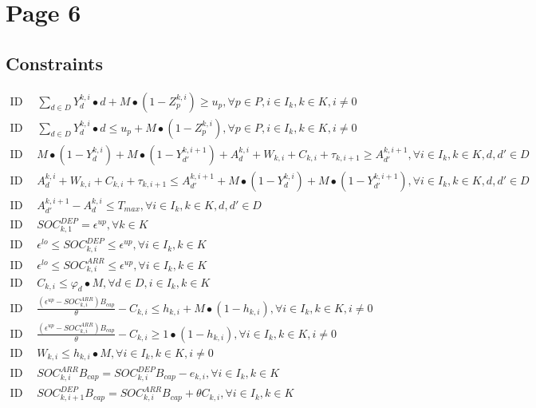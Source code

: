 \documentclass[11pt]{ctexart}
\begin{document}
\section*{Page 6}

\subsection*{Constraints}
\begin{align}
    \text{ID 12: } & \sum_{d \in D} Y_{d}^{k,i} \bullet d + M \bullet (1 - Z_{p}^{k,i}) \geq u_p, \forall p \in P, i \in I_k, k \in K, i \neq 0 \tag{12} \\
    \text{ID 13: } & \sum_{d \in D} Y_{d}^{k,i} \bullet d \leq u_p + M \bullet (1 - Z_{p}^{k,i}), \forall p \in P, i \in I_k, k \in K, i \neq 0 \tag{13} \\
    \text{ID 14: } & M \bullet (1 - Y_{d}^{k,i}) + M \bullet (1 - Y_{d'}^{k,i+1}) + A_{d}^{k,i} + W_{k,i} + C_{k,i} + \tau_{k,i+1} \geq A_{d'}^{k,i+1}, \forall i \in I_k, k \in K, d, d' \in D \tag{14} \\
    \text{ID 15: } & A_{d}^{k,i} + W_{k,i} + C_{k,i} + \tau_{k,i+1} \leq A_{d'}^{k,i+1} + M \bullet (1 - Y_{d}^{k,i}) + M \bullet (1 - Y_{d'}^{k,i+1}), \forall i \in I_k, k \in K, d, d' \in D \tag{15} \\
    \text{ID 16: } & A_{d'}^{k,i+1} - A_{d}^{k,i} \leq T_{max}, \forall i \in I_k, k \in K, d, d' \in D \tag{16} \\
    \text{ID 17: } & SOC_{k,1}^{DEP} = \epsilon^{up}, \forall k \in K \tag{17} \\
    \text{ID 18: } & \epsilon^{lo} \leq SOC_{k,i}^{DEP} \leq \epsilon^{up}, \forall i \in I_k, k \in K \tag{18} \\
    \text{ID 19: } & \epsilon^{lo} \leq SOC_{k,i}^{ARR} \leq \epsilon^{up}, \forall i \in I_k, k \in K \tag{19} \\
    \text{ID 20: } & C_{k,i} \leq \varphi_d \bullet M, \forall d \in D, i \in I_k, k \in K \tag{20} \\
    \text{ID 21: } & \frac{(\epsilon^{up} - SOC_{k,i}^{ARR})B_{cap}}{\theta} - C_{k,i} \leq h_{k,i} + M \bullet (1 - h_{k,i}), \forall i \in I_k, k \in K, i \neq 0 \tag{21} \\
    \text{ID 22: } & \frac{(\epsilon^{up} - SOC_{k,i}^{ARR})B_{cap}}{\theta} - C_{k,i} \geq 1 \bullet (1 - h_{k,i}), \forall i \in I_k, k \in K, i \neq 0 \tag{22} \\
    \text{ID 23: } & W_{k,i} \leq h_{k,i} \bullet M, \forall i \in I_k, k \in K, i \neq 0 \tag{23} \\
    \text{ID 24: } & SOC_{k,i}^{ARR} B_{cap} = SOC_{k,i}^{DEP} B_{cap} - e_{k,i}, \forall i \in I_k, k \in K \tag{24} \\
    \text{ID 25: } & SOC_{k,i+1}^{DEP} B_{cap} = SOC_{k,i}^{ARR} B_{cap} + \theta C_{k,i}, \forall i \in I_k, k \in K \tag{25}
\end{align}
\end{document}
